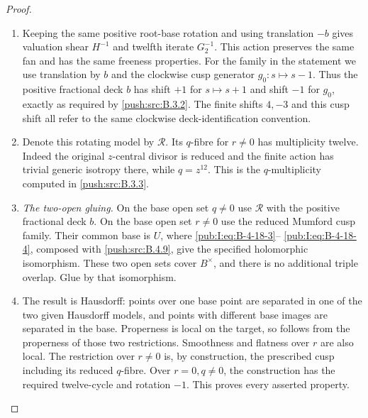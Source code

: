 \begin{proof}
\begin{enumerate}[label=\arabic*.,leftmargin=*]
\item Keeping the same positive root-base rotation and using translation
$-b$ gives valuation shear $H^{-1}$ and twelfth iterate
$G_2^{-1}$. This action preserves the same fan and has the same
freeness properties. For the family in the statement we use
translation by $b$ and the clockwise cusp generator
$g_0:s\mapsto s-1$. Thus the
positive fractional deck $b$ has shift $+1$ for
$s\mapsto s+1$ and shift $-1$ for $g_0$, exactly
as required by \ref{push:src:B.3.2}. The finite shifts $4,-3$
and this cusp shift all refer to the same clockwise
deck-identification convention.

\item Denote this rotating model by $\mathcal R$.
Its $q$-fibre for $r\ne0$ has multiplicity twelve.
Indeed the original $z$-central divisor is reduced
and the finite action has trivial generic isotropy
there, while $q=z^{12}$. This is the $q$-multiplicity computed in \ref{push:src:B.3.3}.

\item \emph{The two-open gluing.}
On the base open set $q\ne0$ use $\mathcal R$ with
the positive fractional deck $b$. On the base open set $r\ne0$
use the reduced Mumford cusp family.
Their common base is $U$, where \eqref{pub:I:eq:B-4-18-3}--
\eqref{pub:I:eq:B-4-18-4}, composed with \ref{push:src:B.4.9}, give the specified
holomorphic isomorphism. These two open sets cover
$B^\times$, and there is no additional triple
overlap. Glue by that isomorphism.

\item The result is Hausdorff: points over one base
point are separated in one of the two given
Hausdorff models, and points with different
base images are separated in the base.
Properness is local on the target, so follows
from the properness of those two restrictions.
Smoothness and flatness over $r$ are also local.
The restriction over $r\ne0$ is, by construction,
the prescribed cusp including its reduced
$q$-fibre. Over $r=0,q\ne0$, the construction has
the required twelve-cycle and rotation $-1$.
This proves every asserted property.

\end{enumerate}
\end{proof}